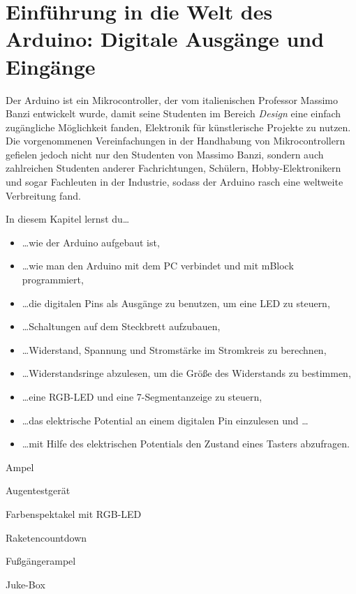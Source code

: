 \chapter{Einführung in die Welt des Arduino: Digitale Ausgänge und Eingänge}

Der Arduino ist ein Mikrocontroller, der vom italienischen Professor Massimo Banzi entwickelt wurde, damit seine Studenten im Bereich \emph{Design} eine einfach zugängliche Möglichkeit fanden, Elektronik für künstlerische Projekte zu nutzen. Die vorgenommenen Vereinfachungen in der Handhabung von Mikrocontrollern gefielen jedoch nicht nur den Studenten von Massimo Banzi, sondern auch zahlreichen Studenten anderer Fachrichtungen, Schülern, Hobby-Elektronikern und sogar Fachleuten in der Industrie, sodass der Arduino rasch eine weltweite Verbreitung fand.

\bigskip
In diesem Kapitel lernst du\dots
\begin{itemize}
	\item \dots wie der Arduino aufgebaut ist,
	\item \dots wie man den Arduino mit dem PC verbindet und mit mBlock programmiert,
	\item \dots die digitalen Pins als Ausgänge zu benutzen, um eine LED zu steuern,
	\item \dots Schaltungen auf dem Steckbrett aufzubauen,
	\item \dots Widerstand, Spannung und Stromstärke im Stromkreis zu berechnen,
	\item \dots Widerstandsringe abzulesen, um die Größe des Widerstands zu bestimmen,
	\item \dots eine RGB-LED und eine 7-Segmentanzeige zu steuern,
	\item \dots das elektrische Potential an einem digitalen Pin einzulesen und \dots
	\item \dots mit Hilfe des elektrischen Potentials den Zustand eines Tasters abzufragen.
\end{itemize}

\begin{projektueberblick}
	\item Ampel \dotfill \pageref{proj:ampel}
	\item Augentestgerät \dotfill\pageref{proj:augentest}
	\item Farbenspektakel mit RGB-LED \dotfill\pageref{proj:rgbled1}
	\item Raketencountdown \dotfill\pageref{proj:raketencountdown}
	\item Fußgängerampel \dotfill\pageref{proj:fussampel}
	\item Juke-Box \dotfill\pageref{proj:jukebox}
\end{projektueberblick}

